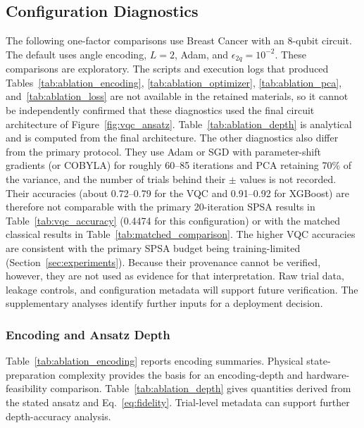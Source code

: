 \FloatBarrier

\subsection{Configuration Diagnostics}
\label{sec:ablation}

The following one-factor comparisons use Breast Cancer with an 8-qubit circuit. The default uses angle encoding, $L=2$, Adam, and $\epsilon_{2q}=10^{-2}$. These comparisons are exploratory. The scripts and execution logs that produced Tables~\ref{tab:ablation_encoding}, \ref{tab:ablation_optimizer}, \ref{tab:ablation_pca}, and~\ref{tab:ablation_loss} are not available in the retained materials, so it cannot be independently confirmed that these diagnostics used the final circuit architecture of Figure~\ref{fig:vqc_ansatz}. Table~\ref{tab:ablation_depth} is analytical and is computed from the final architecture. The other diagnostics also differ from the primary protocol. They use Adam or SGD with parameter-shift gradients (or COBYLA) for roughly 60--85 iterations and PCA retaining 70\% of the variance, and the number of trials behind their $\pm$ values is not recorded. Their accuracies (about 0.72--0.79 for the VQC and 0.91--0.92 for XGBoost) are therefore not comparable with the primary 20-iteration SPSA results in Table~\ref{tab:vqc_accuracy} (0.4474 for this configuration) or with the matched classical results in Table~\ref{tab:matched_comparison}. The higher VQC accuracies are consistent with the primary SPSA budget being training-limited (Section~\ref{sec:experiments}). Because their provenance cannot be verified, however, they are not used as evidence for that interpretation. Raw trial data, leakage controls, and configuration metadata will support future verification. The supplementary analyses identify further inputs for a deployment decision.

\subsubsection{Encoding and Ansatz Depth}

Table~\ref{tab:ablation_encoding} reports encoding summaries. Physical state-preparation complexity provides the basis for an encoding-depth and hardware-feasibility comparison. Table~\ref{tab:ablation_depth} gives quantities derived from the stated ansatz and Eq.~\eqref{eq:fidelity}. Trial-level metadata can support further depth-accuracy analysis.

